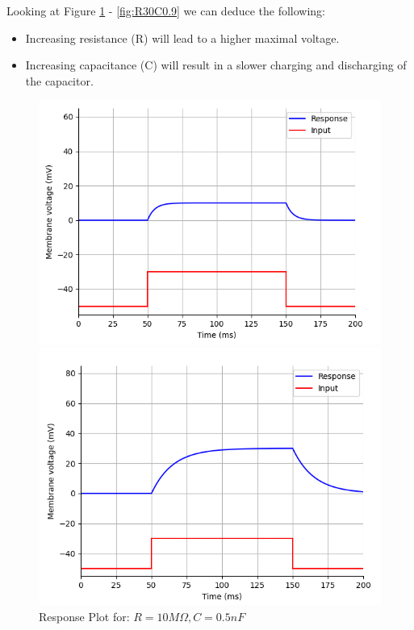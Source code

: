 \documentclass{article}
\begin{document}
    \subsubsection{}
    Looking at Figure \ref{fig:R10C0.5} - \ref{fig:R30C0.9} we can deduce the following:
    \begin{itemize}
        \item Increasing resistance (R) will lead to a higher maximal voltage.
        \item Increasing capacitance (C) will result in a slower charging and discharging of the capacitor.
    \end{itemize}

    \begin{figure}[htbp]
        \centering
        \begin{minipage}[b]{0.3\textwidth}
            \includegraphics[width=\textwidth]{R10C0.5.png}
            \caption{Response Plot for: $R = 10 M\Omega, C = 0.5nF$}
            \label{fig:R10C0.5}
        \end{minipage}
        \hfill
        \begin{minipage}[b]{0.3\textwidth}
            \includegraphics[width=\textwidth]{R30C0.5.png}

\end{minipage}
\end{figure}
\end{document}
